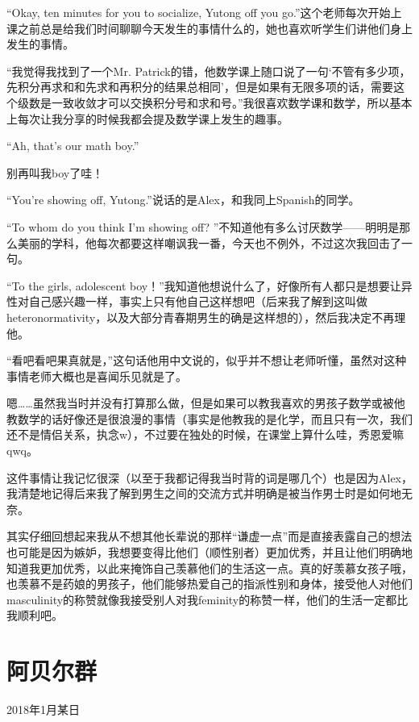 \documentclass{article}
\begin{document}
“Okay, ten minutes for you to socialize, Yutong off you go.”这个老师每次开始上课之前总是给我们时间聊聊今天发生的事情什么的，她也喜欢听学生们讲他们身上发生的事情。

“我觉得我找到了一个Mr. Patrick的错，他数学课上随口说了一句‘不管有多少项，先积分再求和和先求和再积分的结果总相同’，但是如果有无限多项的话，需要这个级数是一致收敛才可以交换积分号和求和号。”我很喜欢数学课和数学，所以基本上每次让我分享的时候我都会提及数学课上发生的趣事。

“Ah, that's our math boy.”

别再叫我boy了哇！

“You're showing off, Yutong.”说话的是Alex，和我同上Spanish的同学。

“To whom do you think I'm showing off? ”不知道他有多么讨厌数学——明明是那么美丽的学科，他每次都要这样嘲讽我一番，今天也不例外，不过这次我回击了一句。

“To the girls, adolescent boy！”我知道他想说什么了，好像所有人都只是想要让异性对自己感兴趣一样，事实上只有他自己这样想吧（后来我了解到这叫做heteronormativity，以及大部分青春期男生的确是这样想的），然后我决定不再理他。

“看吧看吧果真就是，”这句话他用中文说的，似乎并不想让老师听懂，虽然对这种事情老师大概也是喜闻乐见就是了。

嗯……虽然我当时并没有打算那么做，但是如果可以教我喜欢的男孩子数学或被他教数学的话好像还是很浪漫的事情（事实是他教我的是化学，而且只有一次，我们还不是情侣关系，执念w），不过要在独处的时候，在课堂上算什么哇，秀恩爱嘛qwq。

这件事情让我记忆很深（以至于我都记得我当时背的词是哪几个）也是因为Alex，我清楚地记得后来我了解到男生之间的交流方式并明确是被当作男士时是如何地无奈。

其实仔细回想起来我从不想其他长辈说的那样“谦虚一点”而是直接表露自己的想法也可能是因为嫉妒，我想要变得比他们（顺性别者）更加优秀，并且让他们明确地知道我更加优秀，以此来掩饰自己羡慕他们的生活这一点。真的好羡慕女孩子哦，也羡慕不是药娘的男孩子，他们能够热爱自己的指派性别和身体，接受他人对他们masculinity的称赞就像我接受别人对我feminity的称赞一样，他们的生活一定都比我顺利吧。

\section{阿贝尔群}
2018年1月某日
\end{document}
